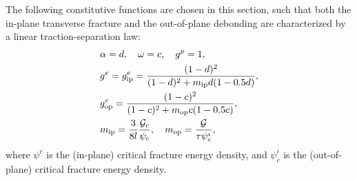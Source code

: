 The following constitutive functions are chosen in this section, such that both the in-plane transverse fracture and the out-of-plane debonding are characterized by a linear traction-separation law:
\begin{subequations}
  \begin{align}
     & \alpha = d, \quad \omega = c, \quad g^p = 1,                                                           \\
     & g^e = g^e_\text{ip} = \dfrac{(1-d)^2}{(1-d)^2 + m_\text{ip} d (1 - 0.5 d)},                            \\
     & g^e_\text{op} = \dfrac{(1-c)^2}{(1-c)^2 + m_\text{op} c (1 - 0.5 c)},                                  \\
     & m_\text{ip} = \dfrac{3}{8l}\dfrac{{\mathcal{G}_c}}{\psi_c}, \quad m_\text{op} = \dfrac{\mathcal{G}}{\tau\psi^i_c}, 
  \end{align}
\end{subequations}
where $\psi^c$ is the (in-plane) critical fracture energy density, and $\psi^i_c$ is the (out-of-plane) critical fracture energy density.
